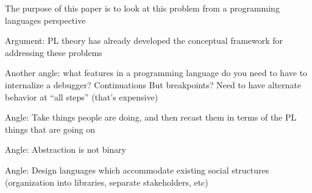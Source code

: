 The purpose of this paper is to look at this problem from a programming languages perspective

Argument: PL theory has already developed the conceptual framework for addressing these problems

Another angle: what features in a programming language do you need to have to internalize a debugger?
	Continuations
	But breakpoints? Need to have alternate behavior at “all steps” (that's expensive)

Angle: Take things people are doing, and then recast them in terms of the PL things that are going on

Angle: Abstraction is not binary

Angle: Design languages which accommodate existing social structures (organization into libraries, separate stakeholders, etc)
